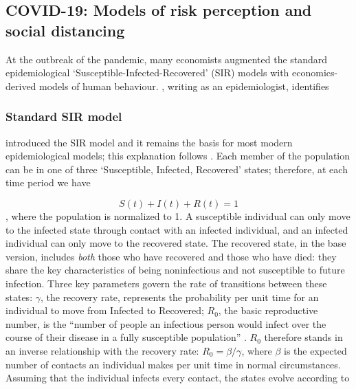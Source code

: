 \documentclass{article}
\begin{document}
\subsection{COVID-19: Models of risk perception and social distancing} 
At the outbreak of the pandemic, many economists augmented the standard epidemiological `Susceptible-Infected-Recovered' (SIR) models with economics-derived models of human behaviour. \textcite{murrayEpidemiologyTimeNeed2020}, writing as an epidemiologist, identifies 
\subsubsection{Standard SIR model}
\textcite{kermackContributionMathematicalTheory1927} introduced the SIR model and it remains the basis for most modern epidemiological models; this explanation follows \textcite{averyEconomistGuideEpidemiology2020}. Each member of the population can be in one of three `Susceptible, Infected, Recovered' states; therefore, at each time period we have

\begin{equation}\label{SIRstates}
    S(t) + I(t) + R(t) = 1
\end{equation}
, where the population is normalized to 1. A susceptible individual can only move to the infected state through contact with an infected individual, and an infected individual can only move to the recovered state. The recovered state, in the base version, includes \textit{both} those who have recovered and those who have died: they share the key characteristics of being noninfectious and not susceptible to future infection. Three key parameters govern the rate of transitions between these states: \(\gamma\), the recovery rate, represents the probability per unit time for an individual to move from Infected to Recovered; \(R_0\), the basic reproductive number, is the ``number of people an infectious person would infect over the course of their disease in a fully susceptible population'' \parencite[81]{averyEconomistGuideEpidemiology2020}. \(R_0\) therefore stands in an inverse relationship with the recovery rate: \(R_0 = \beta / \gamma\), where \(\beta\) is the expected number of contacts an individual makes per unit time in normal circumstances. Assuming that the individual infects every contact, the states evolve according to 
\end{document}
